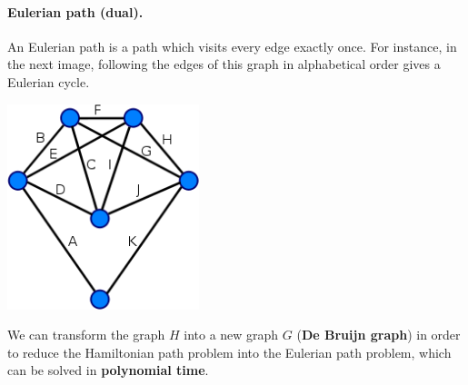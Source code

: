\paragraph*{Eulerian path (dual).} An Eulerian path is a path which visits every edge exactly once. For instance, in the next image, following the edges of this graph in alphabetical order gives a Eulerian cycle.
\begin{center}
	\includegraphics[width=0.3\columnwidth]{img/eulerian}
\end{center} 
We can transform the graph $H$ into a new graph $G$ (\textbf{De Bruijn graph}) in order to reduce the Hamiltonian path problem into the Eulerian path problem, which can be solved in \textbf{polynomial time}.


